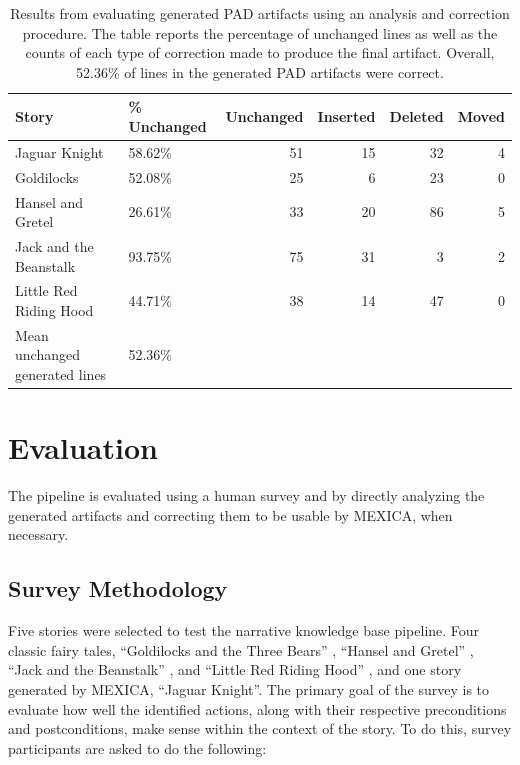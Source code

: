 \documentclass[phd,electronic,oneside,twosidetoc,letterpaper,chaptercenter,parttop,lof]{byumsphd}
\begin{document}
\begin{table}[t]
\centering
\begin{tabular}{llrrrr}
\toprule
                 Story & \% Unchanged &  Unchanged &  Inserted &  Deleted &  Moved \\
\midrule
         Jaguar Knight &            58.62\% &             51 &            15 &           32 &          4 \\
            Goldilocks &            52.08\% &             25 &             6 &           23 &          0 \\
     Hansel and Gretel &            26.61\% &             33 &            20 &           86 &          5 \\
Jack and the Beanstalk &            93.75\% &             75 &            31 &            3 &          2 \\
Little Red Riding Hood &            44.71\% &             38 &            14 &           47 &          0 \\
\midrule
                    Mean unchanged generated lines &            52.36\% &                &              &             &           \\
\bottomrule
\end{tabular}

\caption{Results from evaluating generated PAD artifacts using an analysis and correction procedure. The table reports the percentage of unchanged lines as well as the counts of each type of correction made to produce the final artifact. Overall, 52.36\% of lines in the generated PAD artifacts were correct.}
\label{tab:corrections}
\end{table}


\section{Evaluation}

The pipeline is evaluated using a human survey and by directly analyzing the generated artifacts and correcting them to be usable by MEXICA, when necessary. 


\subsection{Survey Methodology}

Five stories were selected to test the narrative knowledge base pipeline. Four classic fairy tales, ``Goldilocks and the Three Bears'' \cite{steel1922goldilocks}, ``Hansel and Gretel'' \cite{grimm1812hansel}, ``Jack and the Beanstalk'' \cite{steel1918jack}, and ``Little Red Riding Hood'' \cite{perrault1923little}, and one story generated by MEXICA, ``Jaguar Knight''. The primary goal of the survey is to evaluate how well the identified actions, along with their respective preconditions and postconditions, make sense within the context of the story. To do this, survey participants are asked to do the following:
\end{document}

